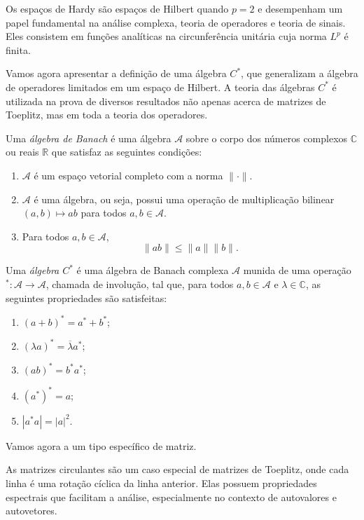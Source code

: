 Os espaços de Hardy são espaços de Hilbert quando $p = 2$ e desempenham um papel fundamental na análise complexa, teoria de operadores e teoria de sinais. Eles consistem em funções analíticas na circunferência unitária cuja norma $L^p$ é finita.

Vamos agora apresentar a definição de uma álgebra $C^\ast$, que generalizam a álgebra de operadores limitados em um espaço de Hilbert. A teoria das álgebras $C^\ast$ é utilizada na prova de diversos resultados não apenas acerca de matrizes de Toeplitz, mas em toda a teoria dos operadores.

\begin{definition*}
  Uma \textit{álgebra de Banach} é uma álgebra $\mathcal{A}$ sobre o corpo dos números complexos $\mathbb{C}$ ou reais $\mathbb{R}$ que satisfaz as seguintes condições:

  \begin{enumerate}
    \item $\mathcal{A}$ é um espaço vetorial completo com a norma $\|\cdot\|$.
    \item $\mathcal{A}$ é uma álgebra, ou seja, possui uma operação de multiplicação bilinear $(a, b) \mapsto ab$ para todos $a, b \in \mathcal{A}$.
    \item Para todos $a, b \in \mathcal{A}$,
          \[ \|ab\| \leq \|a\| \|b\|. \]
  \end{enumerate}
\end{definition*}

\begin{definition*} Uma \textit{álgebra $C^\ast$} é uma álgebra de Banach complexa $\mathcal{A}$ munida de uma operação $^\ast : \mathcal{A} \to \mathcal{A}$, chamada de involução, tal que, para todos $a, b \in \mathcal{A}$ e $\lambda \in \mathbb{C}$, as seguintes propriedades são satisfeitas:
  \begin{enumerate} \item $(a + b)^\ast = a^\ast + b^\ast$; \item $(\lambda a)^\ast = \overline{\lambda} a^\ast$; \item $(ab)^\ast = b^\ast a^\ast$; \item $(a^\ast)^\ast = a$; \item $|a^\ast a| = |a|^2$.
  \end{enumerate}
\end{definition*}

Vamos agora a um tipo específico de matriz.

As matrizes circulantes são um caso especial de matrizes de Toeplitz, onde cada linha é uma rotação cíclica da linha anterior. Elas possuem propriedades espectrais que facilitam a análise, especialmente no contexto de autovalores e autovetores.

